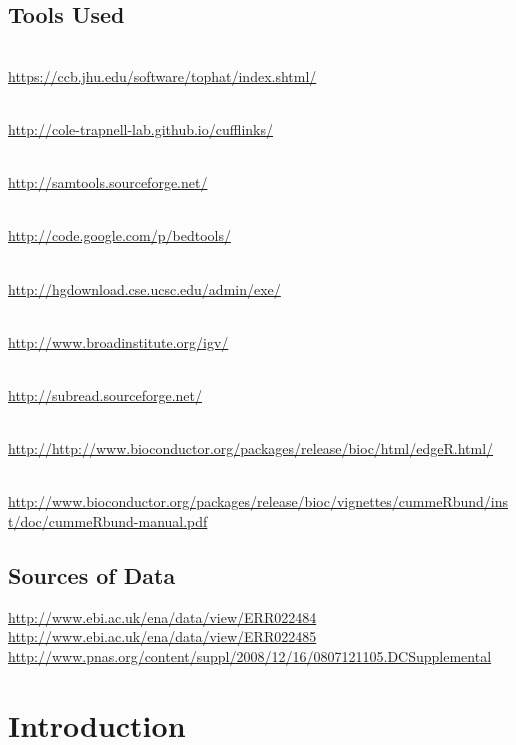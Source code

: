 \subsection{Tools Used}
\begin{description}[style=multiline,labelindent=0cm,align=left,leftmargin=1cm]
  \item[Tophat] \hfill\\
    \url{https://ccb.jhu.edu/software/tophat/index.shtml/}
  \item[Cufflinks] \hfill\\
    \url{http://cole-trapnell-lab.github.io/cufflinks/}
  \item[Samtools] \hfill\\
    \url{http://samtools.sourceforge.net/}
  \item[BEDTools] \hfill\\
    \url{http://code.google.com/p/bedtools/}
  \item[UCSC tools] \hfill\\
    \url{http://hgdownload.cse.ucsc.edu/admin/exe/}
  \item[IGV] \hfill\\
    \url{http://www.broadinstitute.org/igv/}
  \item[FeatureCount] \hfill\\
    \url{http://subread.sourceforge.net/}
  \item[edgeR pakcage] \hfill\\
    \url{http://http://www.bioconductor.org/packages/release/bioc/html/edgeR.html/}
  \item[CummeRbund manual] \hfill\\
    \url{http://www.bioconductor.org/packages/release/bioc/vignettes/cummeRbund/inst/doc/cummeRbund-manual.pdf}
\end{description}

\subsection{Sources of Data}
\url{http://www.ebi.ac.uk/ena/data/view/ERR022484}\\
\url{http://www.ebi.ac.uk/ena/data/view/ERR022485}\\
\url{http://www.pnas.org/content/suppl/2008/12/16/0807121105.DCSupplemental}

\newpage

\section{Introduction}


